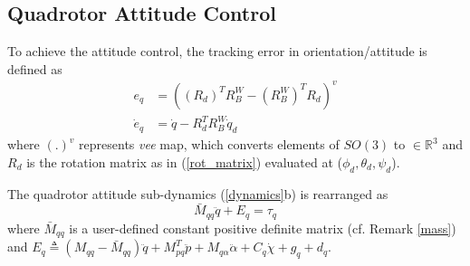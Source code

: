 \documentclass[letterpaper, 10 pt, conference]{ieeeconf}  %
\begin{document}
\subsection{Quadrotor Attitude Control}

To achieve the attitude control, the tracking error in orientation/attitude is defined as \cite{mellinger2011minimum}
\begin{align}
    e_q &= {((R_d)^T R_B^W - (R_B^W)^T R_d)}^{v}  \\
    \dot{e}_q & = \dot{q} - R_d^T R_B^W \dot{q}_d
\end{align}
where $(.)^v$ represents \textit{vee} map, which converts elements of $SO(3)$ to $\in{\mathbb{R}^3}$ and $R_d$ is the rotation matrix as in (\ref{rot_matrix}) evaluated at ($\phi_d, \theta_d, \psi_d$).

The quadrotor attitude sub-dynamics (\ref{dynamics}b) is rearranged as
\begin{equation} \label{dynamics_q}
\bar{M}_{qq}\ddot{q} + E_{q} = \tau_{q}    
\end{equation}
where $\bar{M}_{qq}$ is a user-defined constant positive definite matrix (cf. Remark \ref{mass}) and $E_{q} \triangleq (M_{qq} - \bar{M}_{qq})\ddot{q} + M_{pq}^T\ddot{p} + M_{q\alpha}\ddot{\alpha} + C_{q}\dot{\chi} + g_{q} + d_{q}$. %
\end{document}
